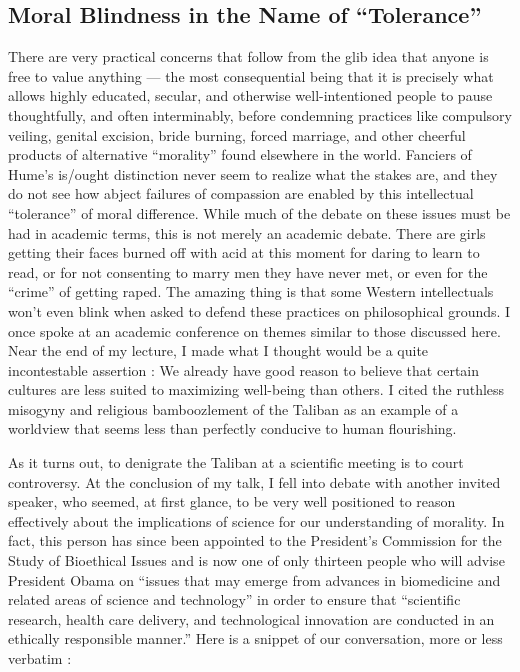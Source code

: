 \documentclass[a4paper,14pt]{extbook}
\begin{document}
\subsection{Moral Blindness in the Name of ``Tolerance''}

There are very practical concerns that follow from the glib idea that anyone is free to value anything --- the most consequential being that it is precisely what allows highly educated, secular, and otherwise well-intentioned people to pause thoughtfully, and often interminably, before condemning practices like compulsory veiling, genital excision, bride burning, forced marriage, and other cheerful products of alternative ``morality'' found elsewhere in the world.
Fanciers of Hume's is/ought distinction never seem to realize what the stakes are, and they do not see how abject failures of compassion are enabled by this intellectual ``tolerance'' of moral difference.
While much of the debate on these issues must be had in academic terms, this is not merely an academic debate.
There are girls getting their faces burned off with acid at this moment for daring to learn to read, or for not consenting to marry men they have never met, or even for the ``crime'' of getting raped.
The amazing thing is that some Western intellectuals won't even blink when asked to defend these practices on philosophical grounds.
I once spoke at an academic conference on themes similar to those discussed here.
Near the end of my lecture, I made what I thought would be a quite incontestable assertion :
We already have good reason to believe that certain cultures are less suited to maximizing well-being than others.
I cited the ruthless misogyny and religious bamboozlement of the Taliban as an example of a worldview that seems less than perfectly conducive to human flourishing.

As it turns out, to denigrate the Taliban at a scientific meeting is to court controversy.
At the conclusion of my talk, I fell into debate with another invited speaker, who seemed, at first glance, to be very well positioned to reason effectively about the implications of science for our understanding of morality.
In fact, this person has since been appointed to the President's Commission for the Study of Bioethical Issues and is now one of only thirteen people who will advise President Obama on ``issues that may emerge from advances in biomedicine and related areas of science and technology'' in order to ensure that ``scientific research, health care delivery, and technological innovation are conducted in an ethically responsible manner.''
Here is a snippet of our conversation, more or less verbatim :
\end{document}
